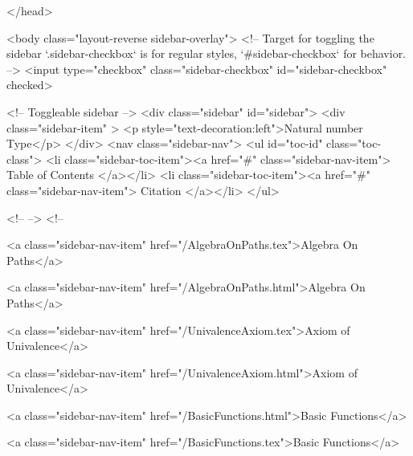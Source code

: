   
</head>




  <body class="layout-reverse sidebar-overlay">
    <!-- Target for toggling the sidebar `.sidebar-checkbox` is for regular
     styles, `#sidebar-checkbox` for behavior. -->
<input type="checkbox" class="sidebar-checkbox" id="sidebar-checkbox" checked>

<!-- Toggleable sidebar -->
<div class="sidebar" id="sidebar">
  <div class="sidebar-item" >
    <p style="text-decoration:left">Natural number Type</p>
  </div>
  <nav class="sidebar-nav">
    <ul id="toc-id" class="toc-class">
  <li class="sidebar-toc-item"><a href="#" class="sidebar-nav-item"> Table of Contents </a></li>
  <li class="sidebar-toc-item"><a href="#" class="sidebar-nav-item"> Citation </a></li>
</ul>


    <!--  -->
    <!-- 
      
    
      
    
      
    
      
        
      
    
      
        
          <a class="sidebar-nav-item" href="/AlgebraOnPaths.tex">Algebra On Paths</a>
        
      
    
      
        
          <a class="sidebar-nav-item" href="/AlgebraOnPaths.html">Algebra On Paths</a>
        
      
    
      
        
          <a class="sidebar-nav-item" href="/UnivalenceAxiom.tex">Axiom of Univalence</a>
        
      
    
      
        
          <a class="sidebar-nav-item" href="/UnivalenceAxiom.html">Axiom of Univalence</a>
        
      
    
      
        
          <a class="sidebar-nav-item" href="/BasicFunctions.html">Basic Functions</a>
        
      
    
      
        
          <a class="sidebar-nav-item" href="/BasicFunctions.tex">Basic Functions</a>
        
      
    
